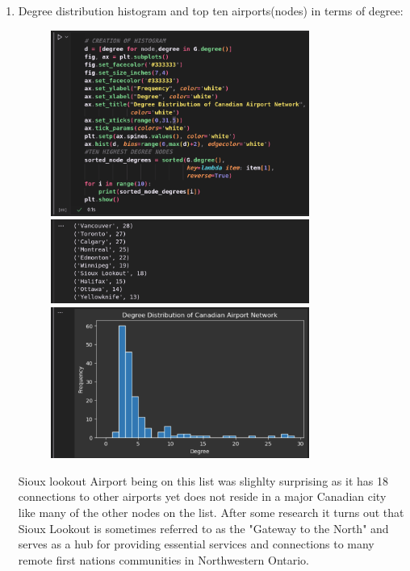 \documentclass{article}
\begin{document}
\begin{enumerate}[label=(\alph*), left=10pt, itemsep=10pt]
        \item \begin{minipage}[t]{0.9\textwidth}
            Degree distribution histogram and top ten airports(nodes) in terms of degree:
            \begin{figure}[H]
                \centering
                \includegraphics[width=0.8\textwidth, height=0.3\textheight]{./1b.png}
                \includegraphics[width=0.8\textwidth, height=0.15\textheight]{./1bi.png}
                \includegraphics[width=0.8\textwidth, height=0.3\textheight]{./1bii.png}
            \end{figure}
            Sioux lookout Airport being on this list was slighlty surprising as it has 18 connections to
            other airports yet does not reside in a major Canadian city like many of the other nodes on the list.
            After some research it turns out that Sioux Lookout is sometimes referred to as the "Gateway to the North"
            and serves as a hub for providing essential services and connections to many remote first nations
            communities in Northwestern Ontario.
        \end{minipage}


\end{enumerate}
\end{document}
